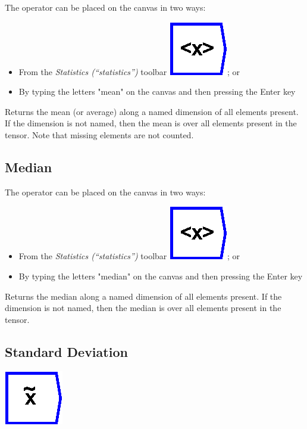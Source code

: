 The operator can be placed on the canvas in two ways:
\begin{itemize}
\item From the \emph{Statistics (``statistics'')} toolbar \includegraphics{images/mean};
or 
\item By typing the letters "mean" on the canvas and then pressing the
Enter key
\end{itemize}
Returns the mean (or average) along a named dimension of all elements
present. If the dimension is not named, then the mean is over all
elements present in the tensor. Note that missing elements are not
counted.

\subsection{Median}

\label{Operation:median}

The operator can be placed on the canvas in two ways:
\begin{itemize}
\item From the \emph{Statistics (``statistics'')} toolbar \includegraphics{images/mean};
or 
\item By typing the letters "median" on the canvas and then pressing the
Enter key
\end{itemize}
Returns the median along a named dimension of all elements present.
If the dimension is not named, then the median is over all elements
present in the tensor.

\subsection{Standard Deviation}

\label{Operation:stdDev}

\includegraphics{images/median}

